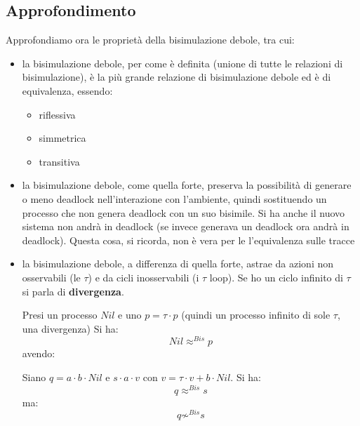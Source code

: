 \subsection{Approfondimento}
Approfondiamo ora le proprietà della bisimulazione debole, tra cui:
\begin{itemize}
  \item la bisimulazione debole, per come è definita (unione di tutte le
  relazioni di bisimulazione), è la più grande relazione di bisimulazione debole
  ed è di equivalenza, essendo:
  \begin{itemize}
    \item riflessiva
    \item simmetrica
    \item transitiva
  \end{itemize}
  \item la bisimulazione debole, come quella forte, preserva la possibilità di
  generare o meno deadlock nell'interazione con l'ambiente, quindi sostituendo
  un processo che non genera deadlock con un suo bisimile. Si ha anche il nuovo
  sistema non andrà in deadlock (se invece generava un deadlock ora andrà
  in deadlock). Questa cosa, si ricorda, non è vera per le l'equivalenza sulle
  tracce
  
  \item la bisimulazione debole, a differenza di quella forte, astrae da azioni
  non osservabili (le $\tau$) e da cicli inosservabili (i $\tau$ loop). Se ho un
  ciclo infinito di $\tau$ si parla di \textbf{divergenza}.
  \begin{esempio}
    Presi un processo $Nil$ e uno $p=\tau\cdot p$ (quindi un processo infinito
    di sole $\tau$, una divergenza) Si ha:
    \[Nil\approx^{Bis}p\]
    avendo:
    \begin{center}
    \end{center}
  \end{esempio}
  \begin{esempio}
    Siano $q=a\cdot b\cdot Nil$ e $s\cdot a\cdot v$ con $v=\tau\cdot v+b\cdot
    Nil$. Si ha:
    \[q\approx^{Bis} s\]
    ma:
    \[q\not\sim^{Bis} s\]


\end{esempio}
\end{itemize}
